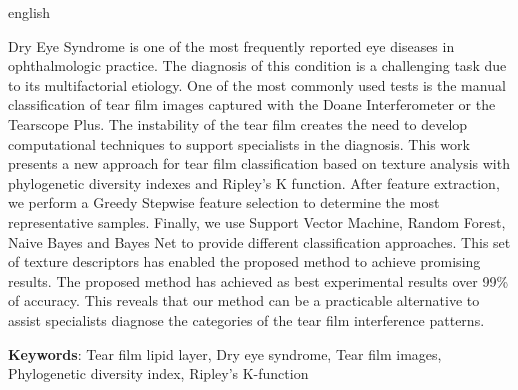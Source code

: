 \begin{resumo}[Abstract]
 \begin{otherlanguage*}{english}

Dry Eye Syndrome is one of the most frequently reported eye diseases in ophthalmologic practice. The diagnosis of this condition is a challenging task due to its multifactorial etiology. One of the most commonly used tests is the manual classification of tear film images captured with the Doane Interferometer or the Tearscope Plus. The instability of the tear film creates the need to develop computational techniques to support specialists in the diagnosis. This work presents a new approach for tear film classification based on texture analysis with phylogenetic diversity indexes and Ripley's K function. After feature extraction, we perform a Greedy Stepwise feature selection to determine the most representative samples. Finally, we use Support Vector Machine, Random Forest, Naive Bayes and Bayes Net to provide different classification approaches. This set of texture descriptors has enabled the proposed method to achieve promising results. The proposed method has achieved as best experimental results over 99\% of accuracy. This reveals that our method can be a practicable alternative to assist specialists diagnose the categories of the tear film interference patterns.

\textbf{Keywords}: Tear film lipid layer, Dry eye syndrome, Tear film images, Phylogenetic diversity index, Ripley's K-function
 \end{otherlanguage*}
\end{resumo}